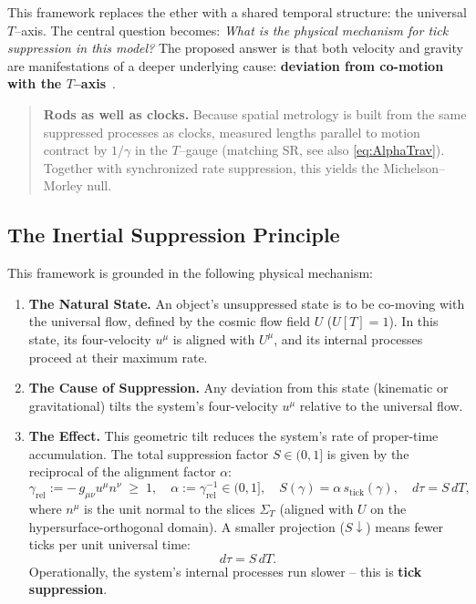 \documentclass[12pt]{article}
\theoremstyle{plain} %
\newcommand{\gammarel}{\gamma_{\!\mathrm{rel}}}
\newcommand{\stick}{s_{\mathrm{tick}}}
\begin{document}
\medskip
\noindent
This framework replaces the ether with a shared temporal structure: the universal $T$–axis. The central question becomes: \textit{What is the physical mechanism for tick suppression in this model?} The proposed answer is that both velocity and gravity are manifestations of a deeper underlying cause: \textbf{deviation from co-motion with the $T$–axis}~\cite{Mermin1984}.

\begin{quote}\footnotesize
\textbf{Rods as well as clocks.} Because spatial metrology is built from the same suppressed processes as clocks, measured lengths parallel to motion contract by $1/\gamma$ in the $T$–gauge (matching SR, see also \eqref{eq:AlphaTrav}). Together with synchronized rate suppression, this yields the Michelson–Morley null.
\end{quote}

\subsection*{The Inertial Suppression Principle}

This framework is grounded in the following physical mechanism:

\begin{enumerate}
    \item \textbf{The Natural State.} An object's unsuppressed state is to be co-moving with the universal flow, defined by the cosmic flow field $U$ ($U[T]=1$). In this state, its four-velocity $u^\mu$ is aligned with $U^\mu$, and its internal processes proceed at their maximum rate.

    \item \textbf{The Cause of Suppression.} Any deviation from this state (kinematic or gravitational) tilts the system’s four-velocity $u^\mu$ relative to the universal flow.

    \item \textbf{The Effect.} This geometric tilt reduces the system's rate of proper-time accumulation. The total suppression factor $S \in (0,1]$ is given by the reciprocal of the alignment factor $\alpha$:
    \begin{equation}
    \gammarel := -\,g_{\mu\nu}u^\mu n^\nu \;\ge\; 1,\quad
    \alpha := \gammarel^{-1}\in(0,1],\quad
    S(\gamma)=\alpha\,\stick(\gamma),\quad d\tau=S\,dT,
    \label{eq:InertialSuppression}
    \end{equation}
    where $n^\mu$ is the unit normal to the slices $\Sigma_T$ (aligned with $U$ on the hypersurface-orthogonal domain).
    A smaller projection ($S\downarrow$) means fewer ticks per unit universal time:
    \begin{equation}
        d\tau = S \, dT .
        \label{eq:SuppressionGeneral}
    \end{equation}
    Operationally, the system’s internal processes run slower – this is \textbf{tick suppression}.
\end{enumerate}
\end{document}
